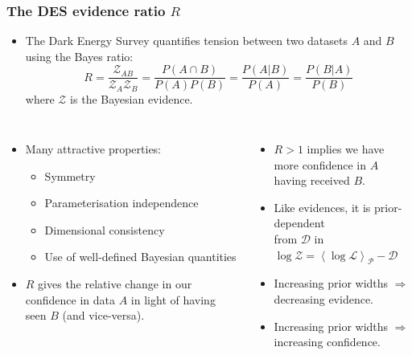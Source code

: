 \documentclass[aspectratio=169]{beamer}
\newcommand{\av}[2][]{\left\langle #2\right\rangle_{#1}}
\begin{document}
\begin{frame}
    \frametitle{The DES evidence ratio $R$}
    \begin{itemize}
        \item The Dark Energy Survey  quantifies tension between two datasets $A$ and $B$ using the Bayes ratio:
            \[
                R = \frac{\mathcal{Z}_{AB}}{\mathcal{Z}_A \mathcal{Z}_B} = \frac{P(A\cap B)}{P(A)P(B)} = \frac{P(A|B)}{P(A)} = \frac{P(B|A)}{P(B)}
            \]
            where $\mathcal{Z}$ is the Bayesian evidence.
    \end{itemize}
    \begin{columns}
        \begin{itemize}
            \item Many attractive properties:
                \begin{itemize}
                    \item Symmetry
                    \item Parameterisation independence
                    \item Dimensional consistency
                    \item Use of well-defined Bayesian quantities
                \end{itemize}
            \item $R$ gives the relative change in our confidence in data $A$ in light of having seen $B$ (and vice-versa).
        \end{itemize}
        \begin{itemize}
            \item $R>1$ implies we have more confidence in $A$ having received $B$.
            \item Like evidences, it is prior-dependent \\ from $\mathcal{D}$ in $\log \mathcal{Z} = \av[\mathcal{P}]{\log\mathcal{L}}-\mathcal{D}$
            \item Increasing prior widths $\Rightarrow$ decreasing evidence. 
            \item Increasing prior widths $\Rightarrow$ increasing confidence.
        \end{itemize}
    \end{columns}
\end{frame}
\end{document}
